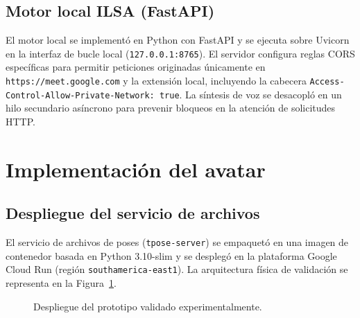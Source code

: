 \subsection{Motor local ILSA (FastAPI)}
El motor local se implementó en Python con FastAPI y se ejecuta sobre Uvicorn en la interfaz de bucle local (\texttt{127.0.0.1:8765}). El servidor configura reglas CORS específicas para permitir peticiones originadas únicamente en \texttt{https://meet.google.com} y la extensión local, incluyendo la cabecera \texttt{Access-Control-Allow-Private-Network: true}. La síntesis de voz se desacopló en un hilo secundario asíncrono para prevenir bloqueos en la atención de solicitudes HTTP.

\section{Implementación del avatar}

\subsection{Despliegue del servicio de archivos}
El servicio de archivos de poses (\texttt{tpose-server}) se empaquetó en una imagen de contenedor basada en Python 3.10-slim y se desplegó en la plataforma Google Cloud Run (región \texttt{southamerica-east1}). La arquitectura física de validación se representa en la Figura~\ref{fig:despliegue_prototipo}.

\begin{figure}[H]
    \centering
    \caption{Despliegue del prototipo validado experimentalmente.}
    \label{fig:despliegue_prototipo}
\end{figure}

